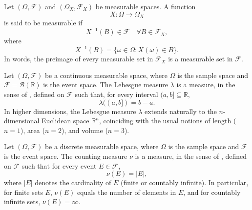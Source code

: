 \begin{definition}
	\label{def:measurable_function}
	Let $(\Omega,\mathcal{F})$ and $(\Omega_X,\mathcal{F}_X)$ be measurable spaces. A function
	\begin{equation}
		X\colon \Omega \to \Omega_X
	\end{equation}
	is said to be measurable if
	\begin{equation}
		X^{-1}(B) \in \mathcal{F} \quad \forall B \in \mathcal{F}_X,
	\end{equation}
	where
	\begin{equation}
		X^{-1}(B) = \{\omega \in \Omega \colon X(\omega) \in B\}.
	\end{equation}
	In words, the preimage of every measurable set in $\mathcal{F}_X$ is a measurable set in $\mathcal{F}$.
\end{definition}

\begin{definition}
	\label{def:lebesgue_measure}
	Let $(\Omega, \mathcal{F})$ be a continuous measurable space, where $\Omega$ is the sample space and $\mathcal{F} = \mathcal{B}(\mathbb{R})$ is the event space. The Lebesgue measure $\lambda$ is a measure, in the sense of , defined on $\mathcal{F}$ such that, for every interval $(a,b] \subseteq \mathbb{R}$,
	\begin{equation}
		\lambda((a,b]) = b-a.
	\end{equation}
	In higher dimensions, the Lebesgue measure $\lambda$ extends naturally to the $n$-dimensional Euclidean space $\mathbb{R}^n$, coinciding with the usual notions of length ($n=1$), area ($n=2$), and volume ($n=3$).
\end{definition}

\begin{definition}
	\label{def:counting_measure}
	Let $(\Omega, \mathcal{F})$ be a discrete measurable space, where $\Omega$ is the sample space and $\mathcal{F}$ is the event space. The counting measure $\nu$ is a measure, in the sense of , defined on $\mathcal{F}$ such that for every event $E \in \mathcal{F}$,
	\begin{equation}
		\nu(E) = |E|,
	\end{equation}
	where $|E|$ denotes the cardinality of $E$ (finite or countably infinite). In particular, for finite sets $E$, $\nu(E)$ equals the number of elements in $E$, and for countably infinite sets, $\nu(E) = \infty$.
\end{definition}

